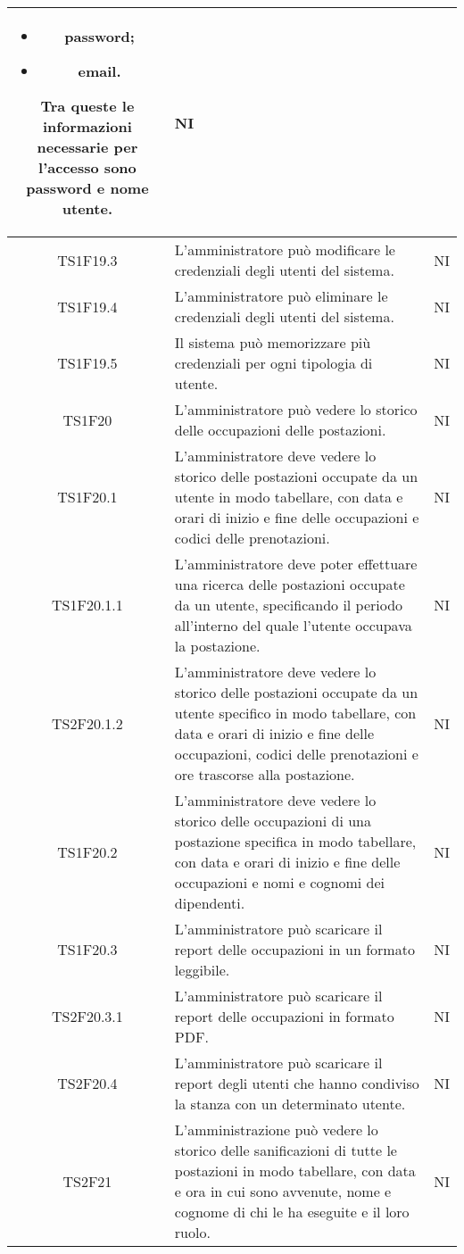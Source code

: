\begin{center}
\begin{longtable}{|c|p{10cm}|c|}
\begin{itemize}
				\item password;
				\item email.
			\end{itemize}
			Tra queste le informazioni necessarie per l’accesso sono password e nome utente. & NI \\	
			\hline
			TS1F19.3 & L’amministratore può modificare le credenziali degli utenti del sistema. & NI \\	
			\hline
			TS1F19.4 & L’amministratore può eliminare le credenziali degli utenti del sistema. & NI \\	
			\hline
			TS1F19.5 & Il sistema può memorizzare più credenziali per ogni tipologia di utente. & NI \\	
			\hline
			TS1F20 & L'amministratore può vedere lo storico delle occupazioni delle postazioni. & NI \\	
			\hline
			TS1F20.1 & L'amministratore deve vedere lo storico delle postazioni occupate da un utente in modo tabellare, con data e orari di inizio e fine delle occupazioni e codici delle prenotazioni. & NI \\	
			\hline
			TS1F20.1.1 & L'amministratore deve poter effettuare una ricerca delle postazioni occupate da un utente, specificando il periodo all'interno del quale l'utente occupava la postazione. & NI \\	
			\hline
			TS2F20.1.2 & L'amministratore deve vedere lo storico delle postazioni occupate da un utente specifico in modo tabellare, con data e orari di inizio e fine delle occupazioni, codici delle prenotazioni e ore trascorse alla postazione. & NI \\	
			\hline
			TS1F20.2 & L'amministratore deve vedere lo storico delle occupazioni di una postazione specifica in modo tabellare, con data e orari di inizio e fine delle occupazioni e nomi e cognomi dei dipendenti. & NI \\			
			\hline
			TS1F20.3 & L'amministratore può scaricare il report delle occupazioni in un formato leggibile. & NI \\		
			\hline
			TS2F20.3.1 & L'amministratore può scaricare il report delle occupazioni in formato PDF. & NI \\		
			\hline			
			TS2F20.4 & L'amministratore può scaricare il report degli utenti che hanno condiviso la stanza con un determinato utente. & NI \\		
			\hline
			TS2F21 & L'amministrazione può vedere lo storico delle sanificazioni di tutte le postazioni in modo tabellare, con data e ora in cui sono avvenute, nome e cognome di chi le ha eseguite e il loro ruolo. & NI \\	

\end{longtable}
\end{center}
